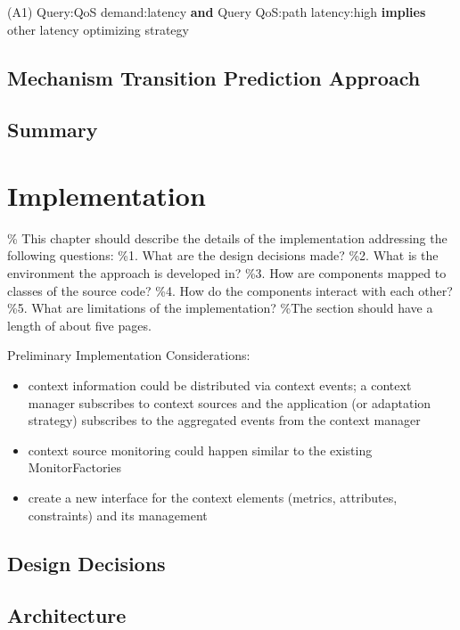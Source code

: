 \begin{center}
(A1) Query:QoS demand:latency \textbf{and} Query QoS:path latency:high \textbf{implies} other latency optimizing strategy\\

\end{center}

\section{Mechanism Transition Prediction Approach}
\section{Summary}

\chapter{Implementation}
\% This chapter should describe the details of the implementation addressing the following questions:
\%1. What are the design decisions made?
\%2. What is the environment the approach is developed in?
\%3. How are components mapped to classes of the source code?
\%4. How do the components interact with each other?
\%5. What are limitations of the implementation?
\%The section should have a length of about five pages.


Preliminary Implementation Considerations:
\begin{itemize}
\item context information could be distributed via context events; a context manager subscribes to context sources and the application (or adaptation strategy) subscribes to the aggregated events from the context manager
\item context source monitoring could happen similar to the existing MonitorFactories
\item create a new interface for the context elements (metrics, attributes, constraints) and its management
\end{itemize}


\section{Design Decisions}
\section{Architecture}
